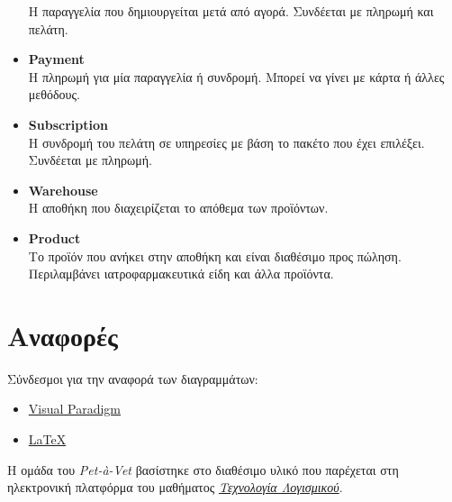 \documentclass[12pt,a4paper,twoside]{book}
\begin{document}
\begin{itemize}
          Η παραγγελία που δημιουργείται μετά από αγορά. Συνδέεται με πληρωμή και πελάτη. %
    \item \textbf{Payment}\\
          Η πληρωμή για μία παραγγελία ή συνδρομή. Μπορεί να γίνει με κάρτα ή άλλες μεθόδους. %
    \item \textbf{Subscription}\\
          Η συνδρομή του πελάτη σε υπηρεσίες με βάση το πακέτο που έχει επιλέξει. Συνδέεται με πληρωμή. %
    \item \textbf{Warehouse}\\
          Η αποθήκη που διαχειρίζεται το απόθεμα των προϊόντων. %
    \item \textbf{Product}\\
          Το προϊόν που ανήκει στην αποθήκη και είναι διαθέσιμο προς πώληση. Περιλαμβάνει ιατροφαρμακευτικά είδη και άλλα προϊόντα. %
\end{itemize}

\chapter{Αναφορές}

Σύνδεσμοι για την αναφορά των διαγραμμάτων: %
\begin{itemize}
    \item \href{https://www.visual-paradigm.com/}{Visual Paradigm}
    \item \href{https://www.latex-project.org/}{LaTeX}
\end{itemize}

Η ομάδα του \textit{Pet-à-Vet} βασίστηκε στο διαθέσιμο υλικό που παρέχεται στη ηλεκτρονική πλατφόρμα του μαθήματος \href{https://eclass.upatras.gr/courses/CEID1030/}{\textit{Τεχνολογία Λογισμικού}}. %
\end{document}
